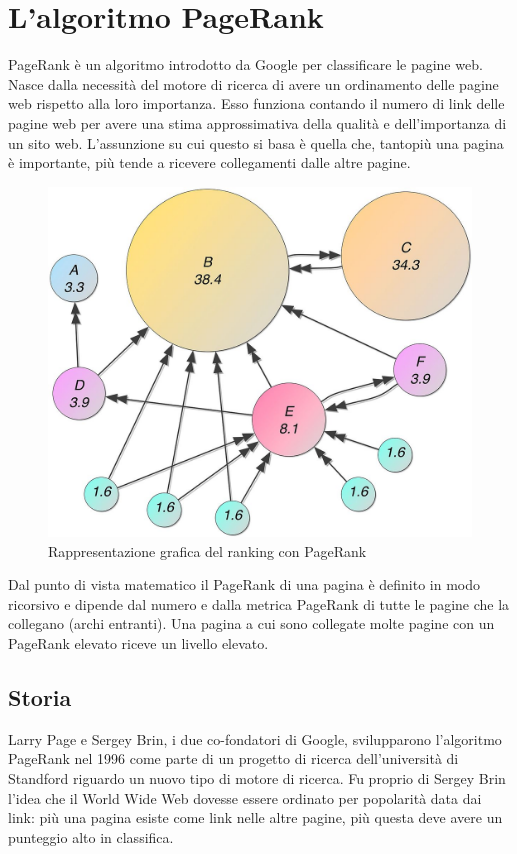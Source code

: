 \documentclass[a4paper,12pt]{article}
\let\oldsection\section
\renewcommand\section{\clearpage\oldsection}
\begin{document}
\section{L'algoritmo PageRank}
PageRank è un algoritmo introdotto da Google per classificare le pagine web. 
Nasce dalla necessità del motore di ricerca di avere un ordinamento delle pagine web rispetto alla loro importanza. Esso funziona contando il numero di link delle pagine web per avere una stima approssimativa della qualità e dell'importanza di un sito web. L'assunzione su cui questo si basa è quella che, tantopiù una pagina è importante, più tende a ricevere collegamenti dalle altre pagine.
\begin{figure}[h!]
  \includegraphics[width=\linewidth]{images/pagerank.jpg}
  \caption{Rappresentazione grafica del ranking con PageRank}
\end{figure}
Dal punto di vista matematico il PageRank di una pagina è definito in modo ricorsivo e dipende dal numero e dalla metrica PageRank di tutte le pagine che la collegano (archi entranti). Una pagina a cui sono collegate molte pagine con un PageRank elevato riceve un livello elevato.
\subsection{Storia}
Larry Page e Sergey Brin, i due co-fondatori di Google, svilupparono l'algoritmo PageRank nel 1996 come parte di un progetto di ricerca dell'università di Standford riguardo un nuovo tipo di motore di ricerca. Fu proprio di Sergey Brin l'idea che il World Wide Web dovesse essere ordinato per popolarità data dai link: più una pagina esiste come link nelle altre pagine, più questa deve avere un punteggio alto in classifica.
\end{document}
